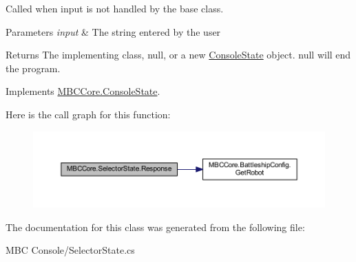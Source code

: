 Called when input is not handled by the base class.


\begin{DoxyParams}{Parameters}
{\em input} & The string entered by the user\\
\hline
\end{DoxyParams}
\begin{DoxyReturn}{Returns}
The implementing class, null, or a new \hyperlink{class_m_b_c_core_1_1_console_state}{Console\-State} object. null will end the program.
\end{DoxyReturn}


Implements \hyperlink{class_m_b_c_core_1_1_console_state_a6eeffce4b7e3c7683bcc27e1baa2131b}{M\-B\-C\-Core.\-Console\-State}.



Here is the call graph for this function\-:\nopagebreak
\begin{figure}[H]
\begin{center}
\leavevmode
\includegraphics[width=350pt]{class_m_b_c_core_1_1_selector_state_ac7bcf5cfee9277b693099688fea06500_cgraph}
\end{center}
\end{figure}




The documentation for this class was generated from the following file\-:\begin{DoxyCompactItemize}
\item 
M\-B\-C Console/Selector\-State.\-cs\end{DoxyCompactItemize}
